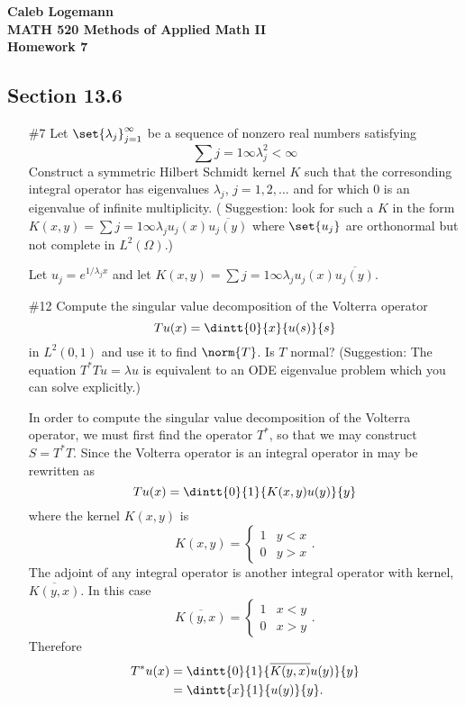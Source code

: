 \documentclass[11pt, oneside]{article}
\begin{document}
\noindent \textbf{\Large{Caleb Logemann \\
MATH 520 Methods of Applied Math II \\
Homework 7
}}

\subsection*{Section 13.6}
\begin{enumerate}
  \item[\#7]
    Let $\set{\lambda_j}_{j = 1}^{\infty}$ be a sequence of nonzero real
    numbers satisfying
    \[
      \sum{j = 1}{\infty}{\lambda_j^2} < \infty
    \]
    Construct a symmetric Hilbert Schmidt kernel $K$ such that the corresonding
    integral operator has eigenvalues $\lambda_j$, $j = 1, 2, \ldots$ and for
    which $0$ is an eigenvalue of infinite multiplicity.
    ( Suggestion: look for such a $K$ in the form
    $K(x, y) = \sum{j = 1}{\infty}{\lambda_j u_j(x) \overline{u_j(y)}}$ where
    $\set{u_j}$ are orthonormal but not complete in $L^2(\Omega)$.)

    Let $u_j = e^{1/\lambda_j x}$ and let
    $K(x, y) = \sum{j = 1}{\infty}{\lambda_j u_j(x) \overline{u_j(y)}}$.

  \pagebreak
  \item[\#12] %
    Compute the singular value decomposition of the Volterra operator
    \[
      Tu(x) = \dintt{0}{x}{u(s)}{s}
    \]
    in $L^2(0, 1)$ and use it to find $\norm{T}$.
    Is $T$ normal?
    (Suggestion: The equation $T^* T u = \lambda u$ is equivalent to an ODE
    eigenvalue problem which you can solve explicitly.)

    In order to compute the singular value decomposition of the Volterra
    operator, we must first find the operator $T^*$, so that we may construct
    $S = T^* T$.
    Since the Volterra operator is an integral operator in may be rewritten as
    \[
      Tu(x) = \dintt{0}{1}{K(x, y)u(y)}{y}
    \]
    where the kernel $K(x, y)$ is
    \[
      K(x, y) =
      \begin{cases}
        1 & y < x \\
        0 & y > x
      \end{cases}.
    \]
    The adjoint of any integral operator is another integral operator with
    kernel, $\overline{K(y, x)}$.
    In this case
    \[
      \overline{K(y, x)} =
      \begin{cases}
        1 & x < y \\
        0 & x > y
      \end{cases}.
    \]
    Therefore
    \begin{align*}
      T^* u(x) &= \dintt{0}{1}{\overline{K(y, x)}u(y)}{y} \\
      &= \dintt{x}{1}{u(y)}{y}.
    \end{align*}


\end{enumerate}
\end{document}
